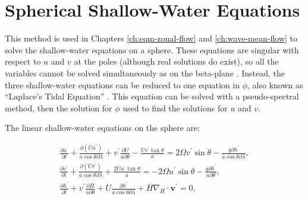 


\section{Spherical Shallow-Water Equations}


 This method is used in Chapters \ref{ch:eqm-zonal-flow} and \ref{ch:wave-mean-flow} to solve the shallow-water equations on a sphere. These equations are singular with respect to $u$ and $v$ at the poles (although real solutions do exist), so all the variables cannot be solved simultaneously as on the beta-plane \citep{iga2005spherical}. Instead, the three shallow-water equations can be reduced to one equation in $\phi$, also known as ``Laplace's Tidal Equation'' \citep{pekeris1975laplace, dunkerton1990laplace}. This equation can be solved with a pseudo-spectral method, then the solution for $\phi$ used to find the solutions for $u$ and $v$.

 The linear shallow-water equations on the sphere are:

 \begin{equation}
   \begin{aligned}
     {\frac{\partial u^{\prime}}{\partial t}+\frac{\partial\left(\overline{U} u^{\prime}\right)}{a \cos \theta \partial \lambda}+v^{\prime} \frac{\partial \overline{U}}{a \partial \theta}-\frac{\overline{U} v^{\prime} \tan \theta}{a}=2 \Omega v^{\prime} \sin \theta-\frac{g \partial h^{\prime}}{a \cos \theta \partial \lambda}}, \\
      {\frac{\partial v^{\prime}}{\partial t}+\frac{\partial\left(\overline{U} v^{\prime}\right)}{a \cos \theta \partial \lambda}+\frac{2 \overline{U} u^{\prime} \tan \theta}{a}=-2 \Omega u^{\prime} \sin \theta-\frac{g \partial h^{\prime}}{a \partial \theta}}, \\
      {\frac{\partial h^{\prime}}{\partial t}+v^{\prime} \frac{\partial \overline{H}}{a \partial \theta}+\overline{U} \frac{\partial h^{\prime}}{a \cos \theta \partial \lambda}+\overline{H} \nabla_{H} \cdot \mathbf{v}^{\prime}=0},
   \end{aligned}
 \end{equation}

